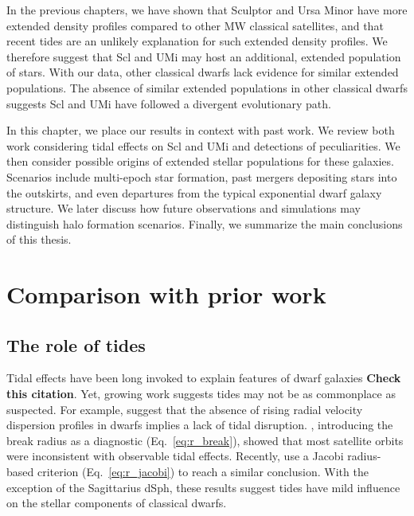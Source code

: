 In the previous chapters, we have shown that Sculptor and Ursa Minor
have more extended density profiles compared to other MW classical
satellites, and that recent tides are an unlikely explanation for such
extended density profiles. We therefore suggest that Scl and UMi may
host an additional, extended population of stars. With our data, other
classical dwarfs lack evidence for similar extended populations. The
absence of similar extended populations in other classical dwarfs
suggests Scl and UMi have followed a divergent evolutionary path.

In this chapter, we place our results in context with past work. We
review both work considering tidal effects on Scl and UMi and detections
of peculiarities. We then consider possible origins of extended stellar
populations for these galaxies. Scenarios include multi-epoch star
formation, past mergers depositing stars into the outskirts, and even
departures from the typical exponential dwarf galaxy structure. We later
discuss how future observations and simulations may distinguish halo
formation scenarios. Finally, we summarize the main conclusions of this
thesis.

\section{Comparison with prior work}\label{comparison-with-prior-work}

\subsection{The role of tides}\label{the-role-of-tides}

Tidal effects have been long invoked to explain features of dwarf
galaxies \citep[e.g.,
Section~\ref{sec:scl_umi_obs_tides},][]{mayer+2001a, tsujimoto+shigeyama2002}
\textbf{Check this citation}. Yet, growing work suggests tides may not
be as commonplace as suspected. For example, \citet{read+2006} suggest
that the absence of rising radial velocity dispersion profiles in dwarfs
implies a lack of tidal disruption. \citet{penarrubia+2009}, introducing
the break radius as a diagnostic (Eq.~\ref{eq:r_break}), showed that
most satellite orbits were inconsistent with observable tidal effects.
Recently, \citet{pace+erkal+li2022} use a Jacobi radius-based criterion
(Eq.~\ref{eq:r_jacobi}) to reach a similar conclusion. With the
exception of the Sagittarius dSph, these results suggest tides have mild
influence on the stellar components of classical dwarfs.

